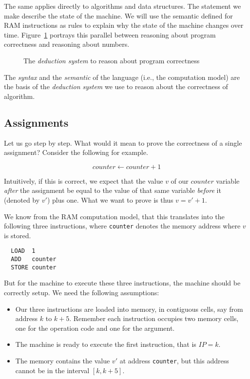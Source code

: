 \documentclass{aldast}
\begin{document}
The same applies directly to algorithms and data structures. The
statement we make describe the state of the machine. We will use the
semantic defined for RAM instructions as rules to explain why the
state of the machine changes over
time. Figure~\ref{fig:deduction-system} portrays this parallel between
reasoning about program correctness and reasoning about numbers.

\begin{figure}[htbp]
  \begin{center}
    
  \end{center}
  \caption{The \emph{deduction system} to reason about program correctness}
  \label{fig:deduction-system}
\end{figure}

\begin{takeaway}
  The \emph{syntax} and the \emph{semantic} of the language (i.e., the computation
  model) are the basis of the \emph{deduction system} we use to reason
  about the correctness of algorithm.
\end{takeaway}

\subsection{Assignments}
\label{sec:assignment}

Let us go step by step. What would it mean to prove the correctness of
a single assignment? Consider the following for example.

\begin{equation}
  counter \gets counter + 1
\end{equation}

Intuitively, if this is correct, we expect that the value $v$ of
our $counter$ variable \emph{after} the assignment be
equal to the value of that same variable \emph{before} it
(denoted by $v'$) plus one. What we want to prove is thus
$v = v' + 1$.

We know from the RAM computation model, that this translates into the
following three instructions, where \texttt{counter} denotes the
memory address where $v$ is stored.

\begin{verbatim}
  LOAD  1
  ADD   counter
  STORE counter
\end{verbatim}

But for the machine to execute these three instructions, the machine
should be correctly setup. We need the following assumptions:
\begin{itemize}
\item Our three instructions are loaded into memory, in
  contiguous cells, say from address $k$ to $k+5$. Remember each
  instruction occupies two memory cells, one for the operation code
  and one for the argument.
\item The machine is ready to execute the first instruction, that is
  $\mathit{IP} = k$.
\item The memory contains the value $v'$ at address \texttt{counter},
  but this address cannot be in the interval $[k, k+5]$.
\end{itemize}
\end{document}
